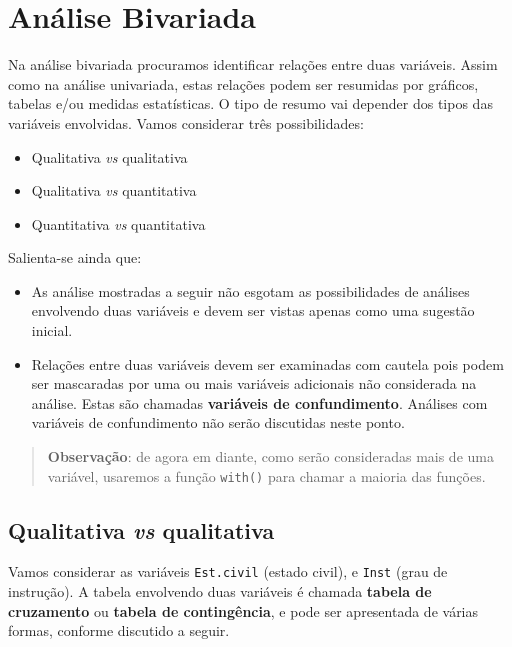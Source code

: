 \documentclass[10pt,a4paper]{book}
\providecommand{\tightlist}{%
  \setlength{\itemsep}{0pt}\setlength{\parskip}{0pt}}
\begin{document}
\section{Análise Bivariada}\label{anuxe1lise-bivariada}

Na análise bivariada procuramos identificar relações entre duas
variáveis. Assim como na análise univariada, estas relações podem ser
resumidas por gráficos, tabelas e/ou medidas estatísticas. O tipo de
resumo vai depender dos tipos das variáveis envolvidas. Vamos considerar
três possibilidades:

\begin{itemize}
\tightlist
\item
  Qualitativa \emph{vs} qualitativa
\item
  Qualitativa \emph{vs} quantitativa
\item
  Quantitativa \emph{vs} quantitativa
\end{itemize}

Salienta-se ainda que:

\begin{itemize}
\tightlist
\item
  As análise mostradas a seguir não esgotam as possibilidades de
  análises envolvendo duas variáveis e devem ser vistas apenas como uma
  sugestão inicial.
\item
  Relações entre duas variáveis devem ser examinadas com cautela pois
  podem ser mascaradas por uma ou mais variáveis adicionais não
  considerada na análise. Estas são chamadas \textbf{variáveis de
  confundimento}. Análises com variáveis de confundimento não serão
  discutidas neste ponto.
\end{itemize}

\begin{quote}
\textbf{Observação}: de agora em diante, como serão consideradas mais de
uma variável, usaremos a função \texttt{with()} para chamar a maioria
das funções.
\end{quote}

\subsection{\texorpdfstring{Qualitativa \emph{vs}
qualitativa}{Qualitativa vs qualitativa}}\label{qualitativa-vs-qualitativa}

Vamos considerar as variáveis \texttt{Est.civil} (estado civil), e
\texttt{Inst} (grau de instrução). A tabela envolvendo duas variáveis é
chamada \textbf{tabela de cruzamento} ou \textbf{tabela de
contingência}, e pode ser apresentada de várias formas, conforme
discutido a seguir.
\end{document}
